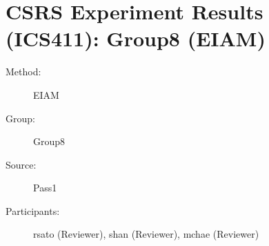 \chapter {CSRS Experiment Results (ICS411): Group8 (EIAM)}
\small
	  

\begin{description}
\item [Method:] EIAM
\item [Group:] Group8
\item [Source:] Pass1
\item [Participants:] rsato (Reviewer), shan (Reviewer), mchae (Reviewer)
\end{description}
